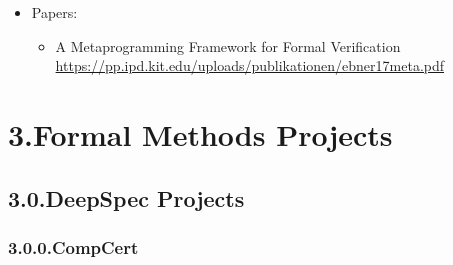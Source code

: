 \documentclass[12pt,twoside]{article}
\begin{document}
\begin{itemize}[noitemsep,topsep=\mdcompacttopsep]%

\item{}Papers:

\begin{itemize}[noitemsep,topsep=\mdcompacttopsep]%

\item{}A Metaprogramming Framework for Formal Verification
\href{https://pp.ipd.kit.edu/uploads/publikationen/ebner17meta.pdf}{{\ttfamily https://\hspace{0pt}pp.\hspace{0pt}ipd.\hspace{0pt}kit.\hspace{0pt}edu/\hspace{0pt}uploads/\hspace{0pt}publikationen/\hspace{0pt}ebner17meta.\hspace{0pt}pdf}}%
\end{itemize}%
\end{itemize}%

\section{3.\hspace*{0.5em}Formal Methods Projects}\label{sec-formal-methods-projects}%

\subsection{3.0.\hspace*{0.5em}DeepSpec Projects}\label{sec-deepspec-projects}%

\subsubsection{3.0.0.\hspace*{0.5em}CompCert}\label{sec-compcert}%
\end{document}
